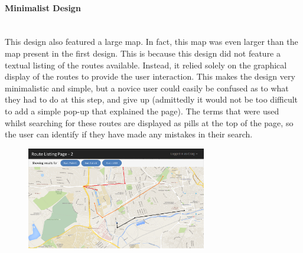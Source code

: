 \paragraph{Minimalist Design}\ \\
This design also featured a large map. In fact, this map was even larger than the map present in the first design. This is because this design did not feature a textual listing of the routes available. Instead, it relied solely on the graphical display of the routes to provide the user interaction. This makes the design very minimalistic and simple, but a novice user could easily be confused as to what they had to do at this step, and give up (admittedly it would not be too difficult to add a simple pop-up that explained the page). The terms that were used whilst searching for these routes are displayed as pills at the top of the page, so the user can identify if they have made any mistakes in their search.

\begin{figure}[!ht]
	\begin{center}
		\includegraphics[width=0.7\textwidth]{images/ui-rlp-2.png}
	\end{center}
	\vspace{-9mm}
\end{figure}

